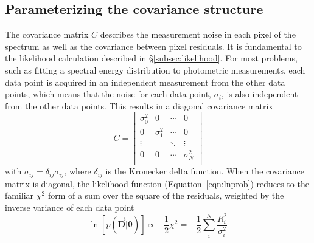 \documentclass[preprint]{aastex} %
\newcommand{\vt}{ {\bm \theta}}
\newcommand{\fD}{ \vec{{\bm D}}}
\begin{document}
\subsection{Parameterizing the covariance structure}
\label{subsec:covariance}
The covariance matrix $C$ describes the measurement noise in each pixel of the spectrum as well as the covariance between pixel residuals. It is fundamental to the likelihood calculation described in \S\ref{subsec:likelihood}. For most problems, such as fitting a spectral energy distribution to photometric measurements, each data point is acquired in an independent measurement from the other data points, which means that the noise for each data point, $\sigma_i$, is also independent from the other data points. This results in a diagonal covariance matrix
\begin{equation}
  C = 
  \begin{bmatrix}
    \sigma_0^2 & 0  & \cdots & 0\\
    0 & \sigma_1^2 & \cdots & 0\\
    \vdots  &   & \ddots  & \vdots \\
    0 & 0 & \cdots & \sigma_N^2\\
  \end{bmatrix}
  \label{eqn:covariance_diagonal}
\end{equation}
with $\sigma_{ij} = \delta_{ij} \sigma_{ij}$, where $\delta_{ij}$ is the Kronecker delta function. When the covariance matrix is diagonal, 
the likelihood function (Equation~\ref{eqn:lnprob}) reduces to the familiar
$\chi^2$ form of a sum over the square of the residuals, weighted by the
inverse variance of each data point
\begin{equation}
  \ln[p(\fD | \vt)] \propto - \frac{1}{2} \chi^2 = - \frac{1}{2} \sum_i^N
   \frac{R_i^2}{\sigma_i^2}
   \label{eqn:chi2}
\end{equation}
\end{document}
